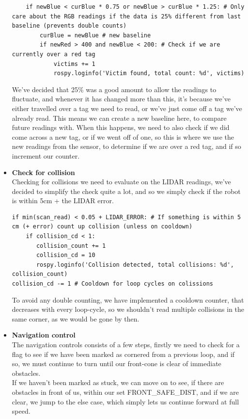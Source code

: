 \documentclass[conference]{IEEEtran}
\begin{document}
\begin{itemize}
\begin{lstlisting}
    if newBlue < curBlue * 0.75 or newBlue > curBlue * 1.25: # Only care about the RGB readings if the data is 25% different from last baseline (prevents double counts)
        curBlue = newBlue # new baseline
        if newRed > 400 and newBlue < 200: # Check if we are currently over a red tag
            victims += 1
            rospy.loginfo('Victim found, total count: %d', victims)
\end{lstlisting}
We've decided that 25\% was a good amount to allow the readings to fluctuate, and whenever it has changed more than this,
it's because we've either travelled over a tag we need to read, or we've just come off a tag we've already read. This means
we can create a new baseline here, to compare future readings with. When this happens, we need to also check if we did come across
a new tag, or if we went off of one, so this is where we use the new readings from the sensor, to determine if we are over a red 
tag, and if so increment our counter.\\
\item \textbf{Check for collision}\\
Checking for collisions we need to evaluate on the LIDAR readings, we've decided to simplify the check quite a lot, and
so we simply check if the robot is within 5cm + the LIDAR error. 
\begin{lstlisting}
if min(scan_read) < 0.05 + LIDAR_ERROR: # If something is within 5 cm (+ error) count up collision (unless on cooldown)
    if collision_cd < 1:
       collision_count += 1
       collision_cd = 10
       rospy.loginfo('Collision detected, total collisions: %d', collision_count)   
collision_cd -= 1 # Cooldown for loop cycles on colissions
\end{lstlisting}
To avoid any double counting, we have implemented a cooldown 
counter, that decreases with every loop-cycle, so we shouldn't read multiple collisions in the same corner, 
as we would be gone by then. \\
\item \textbf{Navigation control}\\
The navigation controls consists of a few steps, firstly we need to check for a flag to see if we have been marked as 
cornered from a previous loop, and if so, we must continue to turn until our front-cone is clear of immediate obstacles.\\
If we haven't been marked as stuck, we can move on to see, if there are obstacles in front of us, within our set FRONT\_SAFE\_DIST,
and if we are clear, we jump to the else case, which simply lets us continue forward at full speed. \\

\end{itemize}
\end{document}
